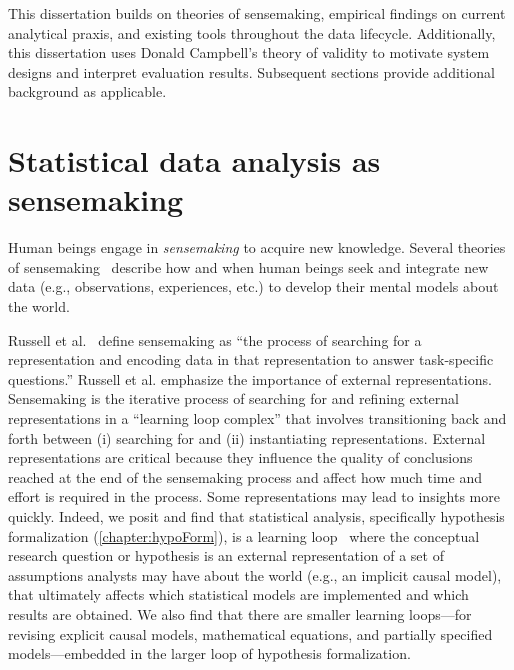 This dissertation builds on theories of sensemaking, empirical findings on
current analytical praxis, and existing tools throughout the data lifecycle.
Additionally, this dissertation uses Donald Campbell's theory of validity to
motivate system designs and interpret evaluation results. Subsequent sections
provide additional background as applicable.

\section{Statistical data analysis as sensemaking}
Human beings engage in \textit{sensemaking} to acquire new knowledge. Several
theories of
sensemaking~\cite{pirolli2005sensemaking,russell1993cost,klein2007dataFrame}
describe how and when human beings seek and integrate new data (e.g.,
observations, experiences, etc.) to develop their mental models about the world.

Russell et al.~\cite{russell1993cost} define sensemaking as ``the process of
searching for a representation and encoding data in that representation to
answer task-specific questions.'' Russell et al. emphasize the importance of
external representations. Sensemaking is the iterative process of searching for
and refining external representations in a ``learning loop complex'' that
involves transitioning back and forth between (i) searching for and (ii)
instantiating representations. External representations are critical because
they influence the quality of conclusions reached at the end of the sensemaking
process and affect how much time and effort is required in the process. Some
representations may lead to insights more quickly. Indeed, we posit and find
that statistical analysis, specifically hypothesis formalization
(\autoref{chapter:hypoForm}), is a learning loop~\cite{russell1993cost} where
the conceptual research question or hypothesis is an external representation of
a set of assumptions analysts may have about the world (e.g., an implicit causal
model), that ultimately affects which statistical models are implemented and
which results are obtained. We also find that there are smaller learning
loops---for revising explicit causal models, mathematical equations, and
partially specified models---embedded in the larger loop of hypothesis
formalization.


